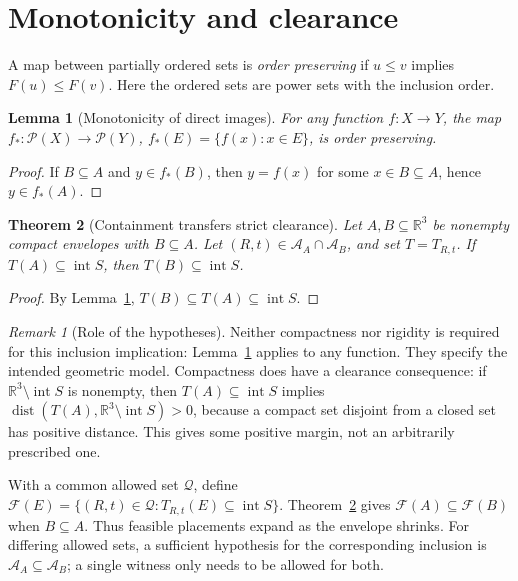 \documentclass[11pt,a4paper]{article}
\newtheorem{theorem}{Theorem}
\newtheorem{lemma}[theorem]{Lemma}
\theoremstyle{definition}
\theoremstyle{remark}
\newtheorem{remark}{Remark}
\newcommand{\R}{\mathbb{R}}
\newcommand{\interior}{\operatorname{int}}
\newcommand{\dist}{\operatorname{dist}}
\newcommand{\Pow}{\mathcal{P}}
\begin{document}
\section{Monotonicity and clearance}
A map between partially ordered sets is \emph{order preserving} if $u\leq v$ implies $F(u)\leq F(v)$. Here the ordered sets are power sets with the inclusion order.
\begin{lemma}[Monotonicity of direct images]\label{lem:image}
For any function $f:X\to Y$, the map $f_*:\Pow(X)\to\Pow(Y)$, $f_*(E)=\{f(x):x\in E\}$, is order preserving.
\end{lemma}
\begin{proof}
If $B\subseteq A$ and $y\in f_*(B)$, then $y=f(x)$ for some $x\in B\subseteq A$, hence $y\in f_*(A)$.
\end{proof}

\begin{theorem}[Containment transfers strict clearance]\label{thm:clearance}
Let $A,B\subseteq\R^3$ be nonempty compact envelopes with $B\subseteq A$. Let $(R,t)\in\mathcal A_A\cap\mathcal A_B$, and set $T=T_{R,t}$. If $T(A)\subseteq\interior S$, then $T(B)\subseteq\interior S$.
\end{theorem}
\begin{proof}
By Lemma~\ref{lem:image}, $T(B)\subseteq T(A)\subseteq\interior S$.
\end{proof}

\begin{remark}[Role of the hypotheses]
Neither compactness nor rigidity is required for this inclusion implication: Lemma~\ref{lem:image} applies to any function. They specify the intended geometric model. Compactness does have a clearance consequence: if $\R^3\setminus\interior S$ is nonempty, then $T(A)\subseteq\interior S$ implies
$\dist(T(A),\R^3\setminus\interior S)>0$, because a compact set disjoint from a closed set has positive distance. This gives some positive margin, not an arbitrarily prescribed one.
\end{remark}

With a common allowed set $\mathcal Q$, define
$\mathcal F(E)=\{(R,t)\in\mathcal Q:T_{R,t}(E)\subseteq\interior S\}$.
Theorem~\ref{thm:clearance} gives $\mathcal F(A)\subseteq\mathcal F(B)$ when $B\subseteq A$. Thus feasible placements expand as the envelope shrinks. For differing allowed sets, a sufficient hypothesis for the corresponding inclusion is $\mathcal A_A\subseteq\mathcal A_B$; a single witness only needs to be allowed for both.
\end{document}

